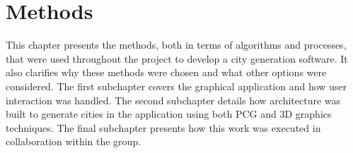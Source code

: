 \chapter{Methods}

This chapter presents the methods, both in terms of algorithms and processes, that were used throughout the project to develop a city generation software.
It also clarifies why these methods were chosen and what other options were considered.
The first subchapter covers the graphical application and how user interaction was handled.
The second subchapter details how architecture was built to generate cities in the application using both PCG and 3D graphics techniques.
The final subchapter presents how this work was executed in collaboration within the group.



